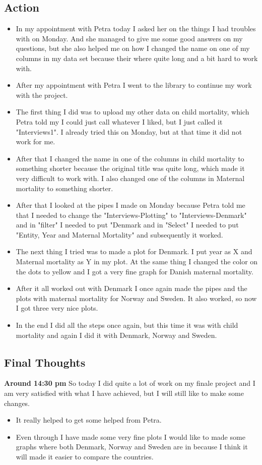 \documentclass{article}
\begin{document}
\subsection{Action}
\begin{itemize}
    \item In my appointment with Petra today I asked her on the things I had troubles with on Monday. And she managed to give me some good answers on my questions, but she also helped me on how I changed the name on one of my columns in my data set because their where quite long and a bit hard to work with. 
    \item After my appointment with Petra I went to the library to continue my work with the project. 
    \item The first thing I did was to upload my other data on child mortality, which Petra told my I could just call whatever I liked, but I just called it "Interviews1". I already tried this on Monday, but at that time it did not work for me.
    \item After that I changed the name in one of the columns in child mortality to something shorter because the original title was quite long, which made it very difficult to work with. I also changed one of the columns in Maternal mortality to something shorter. 
    \item After that I looked at the pipes I made on Monday because Petra told me that I needed to change the "Interviews-Plotting" to "Interviews-Denmark" and in "filter" I needed to put "Denmark and in "Select" I needed to put "Entity, Year and Maternal Mortality" and subsequently it worked. 
    \item The next thing I tried was to made a plot for Denmark. I put year as X and Maternal mortality as Y in my plot. At the same thing I changed the color on the dots to yellow and I got a very fine graph for Danish maternal mortality. 
    \item After it all worked out with Denmark I once again made the pipes and the plots with maternal mortality for Norway and Sweden. It also worked, so now I got three very nice plots. 
    \item In the end I did all the steps once again, but this time it was with child mortality and again I did it with Denmark, Norway and Sweden. 
\end{itemize}
\subsection{Final Thoughts}
\textbf{Around 14:30 pm} So today I did quite a lot of work on my finale project and I am very satisfied with what I have achieved, but I will still like to make some changes.  
\begin{itemize}
    \item It really helped to get some helped from Petra. 
    \item Even through I have made some very fine plots I would like to made some graphs where both Denmark, Norway and Sweden are in because I think it will made it easier to compare the countries. 
\end{itemize}\bigskip
\end{document}

